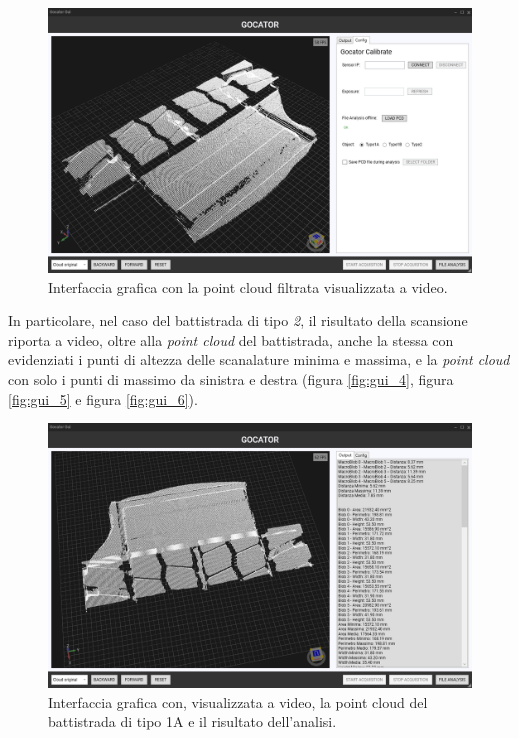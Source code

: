 \begin{figure}[H]
	\centering
	\includegraphics[width=0.9\columnwidth]{./pictures/gui_2.png}
	\caption{Interfaccia grafica con la point cloud filtrata visualizzata a video.}\label{fig:gui_2}
\end{figure}

\noindent In particolare, nel caso del battistrada di tipo \textit{2}, il risultato della scansione riporta a video, oltre alla \textit{point cloud} del battistrada, anche la stessa con evidenziati i punti di altezza delle scanalature minima e massima, e la \textit{point cloud} con solo i punti di massimo da sinistra e destra (figura \ref{fig:gui_4}, figura \ref{fig:gui_5} e figura \ref{fig:gui_6}).

\begin{figure}[H]
	\centering
	\includegraphics[width=0.9\columnwidth]{./pictures/gui_3.png}
	\caption{Interfaccia grafica con, visualizzata a video, la point cloud del battistrada di tipo 1A e il risultato dell'analisi.}\label{fig:gui_3}
\end{figure}

